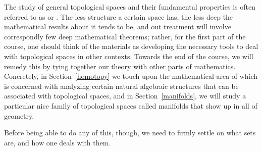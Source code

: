 The study of general topological spaces and their fundamental properties is often referred to as  or . The less structure a certain space has, the less deep the mathematical results about it tends to be, and out treatment will involve correspondly few deep mathematical theorems; rather, for the first part of the course, one should think of the materials as developing the necessary tools to deal with topological spaces in other contexts. Towards the end of the course, we will remedy this by tying together our theory with other parts of mathematics. Concretely, in Section~\ref{homotopy} we touch upon the mathematical area of  which is concerned with analyzing certain natural algebraic structures that can be associated with topological spaces, and in Section~\ref{manifolds}, we will study a particular nice family of topological spaces called manifolds that show up in all of geometry.

Before being able to do any of this, though, we need to firmly settle on what sets are, and how one deals with them.
